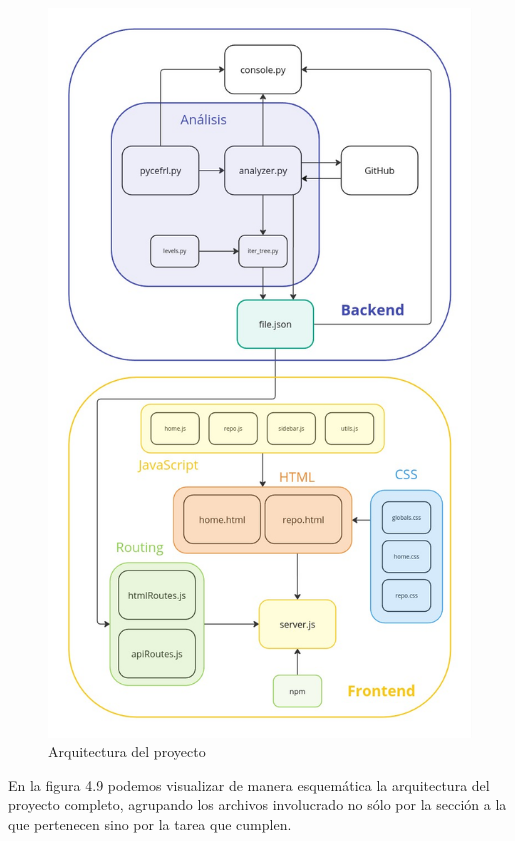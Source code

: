 \documentclass[a4paper, 12pt]{book}
\begin{document}
\begin{figure}
    \centering
    \includegraphics[height=\textheight]{img/arquitectura_total_final.jpg}
    \caption{Arquitectura del proyecto}
    \label{fig:enter-label}
\end{figure}

En la figura 4.9 podemos visualizar de manera esquemática la arquitectura del proyecto completo, agrupando los archivos involucrado no sólo por la sección a la que pertenecen sino por la tarea que cumplen.
\end{document}
